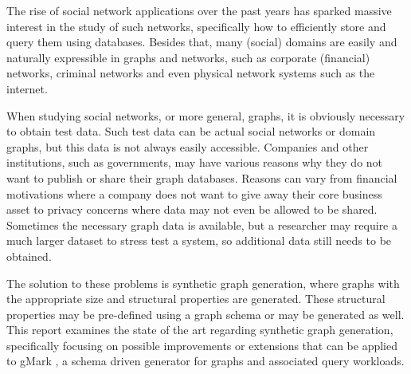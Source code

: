 The rise of social network applications over the past years has sparked massive interest in the study of such networks, specifically how to efficiently store and query them using databases. Besides that, many (social) domains are easily and naturally expressible in graphs and networks, such as corporate (financial) networks, criminal networks and even physical network systems such as the internet.

When studying social networks, or more general, graphs, it is obviously necessary to obtain test data. Such test data can be actual social networks or domain graphs, but this data is not always easily accessible. Companies and other institutions, such as governments, may have various reasons why they do not want to publish or share their graph databases. Reasons can vary from financial motivations where a company does not want to give away their core business asset to privacy concerns where data may not even be allowed to be shared. Sometimes the necessary graph data is available, but a researcher may require a much larger dataset to stress test a system, so additional data still needs to be obtained.

The solution to these problems is synthetic graph generation, where graphs with the appropriate size and structural properties are generated. These structural properties may be pre-defined using a graph schema or may be generated as well.
This report examines the state of the art regarding synthetic graph generation, specifically focusing on possible improvements or extensions that can be applied to gMark \cite{Bagan2016GMark:Queries}, a schema driven generator for graphs and associated query workloads.